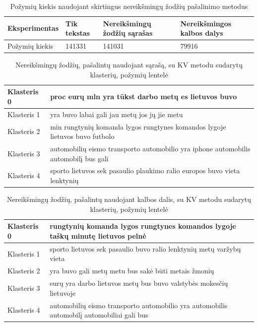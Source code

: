 \documentclass{VUMIFInfBakalaurinis}
\begin{document}
\begin{table}[H]
  \centering
  \caption{Požymių kiekis naudojant skirtingus nereikšmingų žodžių pašalinimo
  metodus}
  \small
  \begin{tabular}{|l|l|l|l|}
  \hline
  Eksperimentas & Tik tekstas & Nereikšmingų žodžių sąrašas & Nereikšmingos kalbos dalys \\ \hline
  Požymių kiekis        & 141331      & 141031                      & 79916                      \\ \hline
  \end{tabular}
  \normalsize
\end{table}

\begin{table}[H]
  \centering
  \caption{Nereikšmingų žodžių, pašalintų naudojant sąrašą, su KV metodu sudarytų
  klasterių, požymių lentelė}
  \label{stoplisttable}
  \small
  \begin{tabular}{|l|l|}
  \hline
  Klasteris 0 & proc eurų mln yra tūkst darbo metų es lietuvos buvo                                 \\ \hline
  Klasteris 1 & yra buvo labai gali jau metų jos jų jie metu                                        \\ \hline
  Klasteris 2 & min rungtynių komanda lygos rungtynes komandos lygoje lietuvos buvo futbolo         \\ \hline
  Klasteris 3 & automobilių eismo transporto automobilio yra iphone automobilis automobilį bus gali \\ \hline
  Klasteris 4 & sporto lietuvos sek pasaulio plaukimo ralio europos buvo vieta lenktynių            \\ \hline
  \end{tabular}
  \normalsize
\end{table}

\begin{table}[H]
  \centering
  \caption{Nereikšmingų žodžių, pašalintų naudojant kalbos dalis, su KV metodu
  sudarytų klasterių, požymių lentelė}
  \label{partstable}
  \small
  \begin{tabular}{|l|l|}
  \hline
  Klasteris 0 & rungtynių komanda lygos rungtynes komandos lygoje taškų minutę lietuvos pelnė             \\ \hline
  Klasteris 1 & sporto lietuvos sek pasaulio buvo ralio lenktynių metų varžybų vieta                      \\ \hline
  Klasteris 2 & yra buvo gali metų metu bus sakė būti metais žmonių                                       \\ \hline
  Klasteris 3 & eurų yra darbo lietuvos metų bus buvo valstybės mokesčių lietuvoje                        \\ \hline
  Klasteris 4 & automobilių eismo transporto automobilio yra automobilis automobilį automobiliai gali bus \\ \hline
  \end{tabular}
  \normalsize
\end{table}
\end{document}
